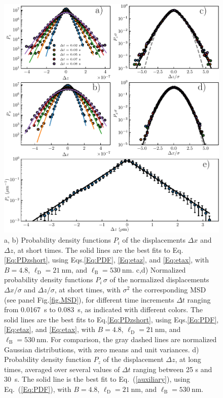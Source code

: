 \begin{figure}[H]
	\centering
	\includegraphics{02_body/chapter3/images/trajctory_analysis/P_displacement.pdf}
	\caption{a, b) Probability density functions $P_i$ of the displacements $\Delta x$ and $\Delta z$, at short times. The solid lines are the best fits to Eq.\ref{Eq:PDzshort}, using Eqs.\ref{Eq:PDF}, \ref{Eq:etaz}, and \ref{Eq:etax}, with $B = 4.8$, $\ell_\mathrm{D} = 21 ~ \mathrm{nm}$, and $\ell_\mathrm{B} = 530~\mathrm{nm}$. c,d) Normalized probability density functions $P_i\,\sigma$ of the normalized displacements $\Delta x/\sigma$ and $\Delta z/\sigma$, at short times, with $\sigma^2$ the corresponding MSD (see panel Fig.\ref{fig.MSD}), for different time increments $\Delta t$ ranging from 0.0167~s to 0.083~s, as indicated with different colors. The solid lines are the best fits to Eq.\ref{Eq:PDzshort}, using Eqs.\ref{Eq:PDF}, \ref{Eq:etaz}, and \ref{Eq:etax}, with $B = 4.8$, $\ell_\mathrm{D} = 21 ~ \mathrm{nm}$, and $\ell_\mathrm{B} = 530~\mathrm{nm}$. For comparison, the gray dashed lines are normalized Gaussian distributions, with zero means and unit variances. d) Probability density function $P_z$ of the displacement $\Delta z$, at long times, averaged over several values of $\Delta t$ ranging between 25 s and 30~s. The solid line is the best fit to Eq.~(\ref{auxiliary}), using Eq.~(\ref{Eq:PDF}), with $B = 4.8$, $\ell_\mathrm{D} = 21 ~ \mathrm{nm}$, and $\ell_\mathrm{B} = 530~\mathrm{nm}$.}
	\label{fig.displacement}
\end{figure}



